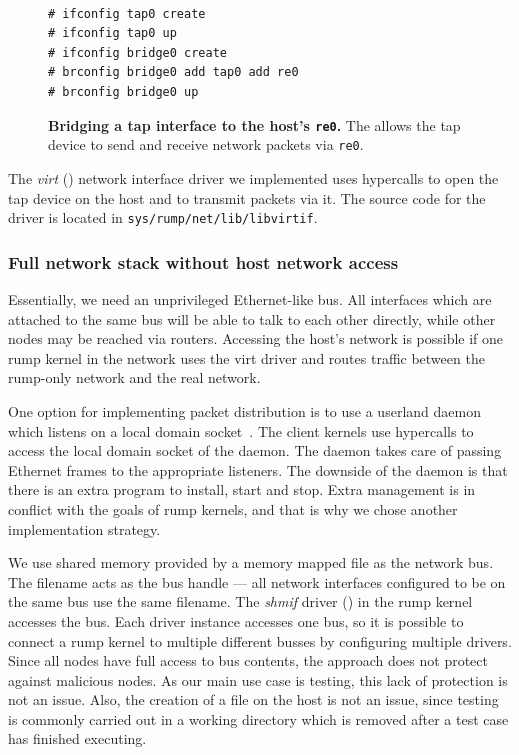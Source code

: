 \begin{figure}[t]
{\tt \scriptsize
\begin{verbatim}
# ifconfig tap0 create
# ifconfig tap0 up
# ifconfig bridge0 create
# brconfig bridge0 add tap0 add re0
# brconfig bridge0 up
\end{verbatim}
}
\caption[Bridging a tap interface to the host's \texttt{re0}]{
\textbf{Bridging a tap interface to the host's \texttt{re0}.}
The allows the tap device to send and receive network packets via \texttt{re0}.
}
\label{fig:tapbridgecmds}
\end{figure}

The \textit{virt} () network interface driver
we implemented uses hypercalls to open the tap device on the
host and to transmit packets via it.  The source code for the driver is
located in \verb+sys/rump/net/lib/libvirtif+.

\subsubsection*{Full network stack without host network access}

Essentially, we need an unprivileged Ethernet-like bus.  All interfaces
which are attached to the same bus will be able to talk to each other
directly, while other nodes may be reached via routers.  Accessing the
host's network is possible if one rump kernel in the network uses the
virt driver and routes traffic between the rump-only network and the
real network.

One option for implementing packet distribution is to use a
userland daemon which listens on a local domain socket~\cite{dike:uml}.
The client kernels use hypercalls to access the local domain socket
of the daemon.  The daemon takes care of passing Ethernet frames to
the appropriate listeners.  The downside of the daemon is that there
is an extra program to install, start and stop.  Extra management is
in conflict with the goals of rump kernels, and that is why we chose
another implementation strategy.

We use shared memory provided by a memory mapped file as the network bus.
The filename acts as the bus handle --- all network interfaces configured
to be on the same bus use the same filename.  The \textit{shmif} driver
() in the rump kernel accesses the bus.
Each driver instance accesses one bus, so it is possible to connect a
rump kernel to multiple different busses by configuring multiple drivers.
Since all nodes have full access to bus contents, the
approach does not protect against malicious nodes.  As our main use case
is testing, this lack of protection is not an issue.  Also, the creation of a file on the
host is not an issue, since testing is commonly carried out in a working
directory which is removed after a test case has finished executing.

